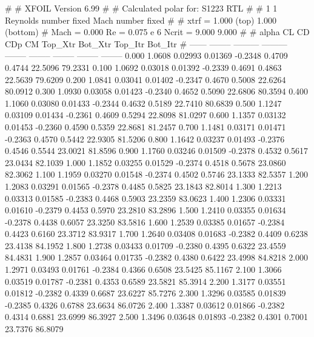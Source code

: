 #  
#       XFOIL         Version 6.99
#  
# Calculated polar for: S1223 RTL                                       
#  
# 1 1 Reynolds number fixed          Mach number fixed         
#  
# xtrf =   1.000 (top)        1.000 (bottom)  
# Mach =   0.000     Re =     0.075 e 6     Ncrit =   9.000  9.000
#  
#   alpha    CL        CD       CDp       CM     Top_Xtr  Bot_Xtr  Top_Itr  Bot_Itr
#  ------ -------- --------- --------- -------- -------- -------- -------- --------
   0.000   1.0608   0.02993   0.01369  -0.2348   0.4709   0.4744  22.5096  79.2331
   0.100   1.0692   0.03018   0.01392  -0.2339   0.4691   0.4863  22.5639  79.6209
   0.200   1.0841   0.03041   0.01402  -0.2347   0.4670   0.5008  22.6264  80.0912
   0.300   1.0930   0.03058   0.01423  -0.2340   0.4652   0.5090  22.6806  80.3594
   0.400   1.1060   0.03080   0.01433  -0.2344   0.4632   0.5189  22.7410  80.6839
   0.500   1.1247   0.03109   0.01434  -0.2361   0.4609   0.5294  22.8098  81.0297
   0.600   1.1357   0.03132   0.01453  -0.2360   0.4590   0.5359  22.8681  81.2457
   0.700   1.1481   0.03171   0.01471  -0.2363   0.4570   0.5442  22.9305  81.5206
   0.800   1.1642   0.03237   0.01493  -0.2376   0.4546   0.5544  23.0021  81.8596
   0.900   1.1760   0.03246   0.01509  -0.2378   0.4532   0.5617  23.0434  82.1039
   1.000   1.1852   0.03255   0.01529  -0.2374   0.4518   0.5678  23.0860  82.3062
   1.100   1.1959   0.03270   0.01548  -0.2374   0.4502   0.5746  23.1333  82.5357
   1.200   1.2083   0.03291   0.01565  -0.2378   0.4485   0.5825  23.1843  82.8014
   1.300   1.2213   0.03313   0.01585  -0.2383   0.4468   0.5903  23.2359  83.0623
   1.400   1.2306   0.03331   0.01610  -0.2379   0.4453   0.5970  23.2810  83.2896
   1.500   1.2410   0.03355   0.01634  -0.2378   0.4438   0.6057  23.3250  83.5816
   1.600   1.2539   0.03385   0.01657  -0.2384   0.4423   0.6160  23.3712  83.9317
   1.700   1.2640   0.03408   0.01683  -0.2382   0.4409   0.6238  23.4138  84.1952
   1.800   1.2738   0.03433   0.01709  -0.2380   0.4395   0.6322  23.4559  84.4831
   1.900   1.2857   0.03464   0.01735  -0.2382   0.4380   0.6422  23.4998  84.8218
   2.000   1.2971   0.03493   0.01761  -0.2384   0.4366   0.6508  23.5425  85.1167
   2.100   1.3066   0.03519   0.01787  -0.2381   0.4353   0.6589  23.5821  85.3914
   2.200   1.3177   0.03551   0.01812  -0.2382   0.4339   0.6687  23.6227  85.7276
   2.300   1.3296   0.03585   0.01839  -0.2385   0.4326   0.6788  23.6634  86.0726
   2.400   1.3387   0.03612   0.01866  -0.2382   0.4314   0.6881  23.6999  86.3927
   2.500   1.3496   0.03648   0.01893  -0.2382   0.4301   0.7001  23.7376  86.8079
